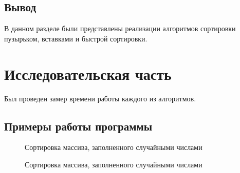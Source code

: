 \documentclass[12pt]{report}
\begin{document}
\section{Вывод}
В данном разделе были представлены реализации алгоритмов сортировки пузырьком, вставками и быстрой сортировки.

\chapter{Исследовательская часть}
Был проведен замер времени работы каждого из алгоритмов.

\section{Примеры работы программы}
\begin{figure}[h]
\caption{Сортировка массива, заполненного случайными числами}
\label{ris:image}
\end{figure}
\newpage
\begin{figure}[h]
\caption{Сортировка массива, заполненного случайными числами}
\label{ris:image}
\end{figure}
\end{document}
